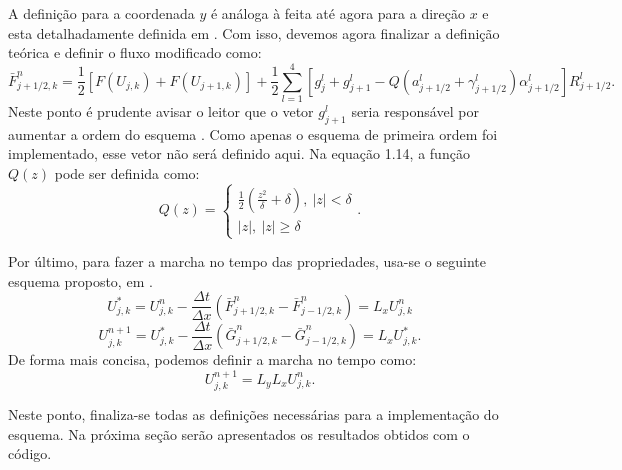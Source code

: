 \documentclass[a4paper, twoside, 12pt]{article}
\numberwithin{equation}{section}
\begin{document}
A definição para a coordenada $y$ é análoga à feita até agora para a direção $x$ e esta detalhadamente definida em \cite{YEE_NASATM_1983}. Com isso, devemos agora finalizar a definição teórica e definir o fluxo modificado como:
\begin{equation}
\bar{F}^{n}_{j+1/2,k}=\frac{1}{2}\left [ F(U_{j,k})+F(U_{j+1,k}) \right ]+\frac{1}{2}\sum_{l=1}^{4}\left [g^{l}_{j}+g^{l}_{j+1}-Q(a^{l}_{j+1/2}+\gamma_{j+1/2}^{l})\alpha^{l}_{j+1/2}  \right ]R^{l}_{j+1/2}.
\end{equation}
Neste ponto é prudente avisar o leitor que o vetor $g^{l}_{j+1}$ seria responsável por aumentar a ordem do esquema \cite{YEE_NASATM_1983}. Como apenas o esquema de primeira ordem foi implementado, esse vetor não será definido aqui. Na equação 1.14, a função $Q(z)$ pode ser definida como:
\begin{equation}
Q(z)=\begin{cases} 
\frac{1}{2}\left ( \frac{z^{2}}{\delta}+\delta \right ), \: |z| <\delta\\
|z|,\: |z|\geq \delta
\end{cases}.
\end{equation}

Por último, para fazer a marcha no tempo das propriedades, usa-se o seguinte esquema proposto, em \cite{YEE_NASATM_1983}.
\begin{equation}
U^{*}_{j,k}=U^{n}_{j,k}-\frac{\Delta t}{\Delta x}\left ( \bar{F}^{n}_{j+1/2,k}-\bar{F}^{n}_{j-1/2,k} \right )=L_{x}U^{n}_{j,k}
\end{equation}
\begin{equation}
U^{n+1}_{j,k}=U^{*}_{j,k}-\frac{\Delta t}{\Delta x}\left ( \bar{G}^{n}_{j+1/2,k}-\bar{G}^{n}_{j-1/2,k} \right )=L_{x}U^{*}_{j,k}.
\end{equation}
De forma mais concisa, podemos definir a marcha no tempo como:
\begin{equation}
U_{j,k}^{n+1}=L_{y}L_{x}U^{n}_{j,k}.
\end{equation}

Neste ponto, finaliza-se todas as definições necessárias para a implementação do esquema. Na próxima seção serão apresentados os resultados obtidos com o código.
\end{document}
